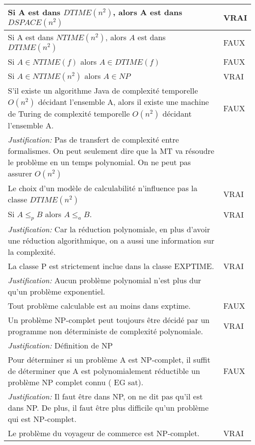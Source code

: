 \begin{longtable}{p{13cm}|l}
    Si A est dans $DTIME(n^{2})$, alors A est dans $DSPACE(n^{2})$ & VRAI\\
    \hline
    Si A est dans $NTIME(n^{2})$, alors $A$ est dans $DTIME(n^{2})$& FAUX \\
    \hline
    Si $A \in NTIME(f)$ alors $A\in DTIME(f)$ & FAUX \\
    \hline
    Si $A \in NTIME(n^{2})$ alors $A \in NP$ & VRAI \\
    \hline
    S'il existe un algorithme Java de complexité temporelle $O(n^{2})$ décidant l'ensemble A, alors il existe une machine de Turing de complexité temporelle $O(n^{2})$ décidant l'ensemble A.& FAUX \\
    \textit{Justification:} Pas de transfert de complexité entre formalismes. On peut seulement dire que la MT va résoudre le problème en un temps polynomial. On ne peut pas assurer $O(n^{2})$ & \\
    \hline
    Le choix d'un modèle de calculabilité n'influence pas la classe $DTIME(n^{2})$ & VRAI \\
    \hline
    Si $A \leq_{p} B$ alors $A \leq_{a} B$. & VRAI \\
    \textit{Justification:} Car la réduction polynomiale, en plus d’avoir une réduction algorithmique, on a aussi une information sur la complexité. & \\
    \hline
    La classe P est strictement inclue dans la classe EXPTIME. & VRAI \\
    \textit{Justification:} Aucun problème polynomial n’est plus dur qu’un problème exponentiel. & \\
    \hline
    Tout problème calculable est au moins dans exptime. & FAUX \\
    \hline
    Un problème NP-complet peut toujours être décidé par un programme non déterministe de complexité polynomiale. & VRAI \\
    \textit{Justification:} Définition de NP & \\
    \hline
    Pour déterminer si un problème A est NP-complet, il suffit de déterminer que A est polynomialement réductible un problème NP complet connu ( EG sat).& FAUX \\
    \textit{Justification:} Il faut être dans NP, on ne dit pas qu’il est dans NP. De plus, il faut être plus difficile qu’un problème qui est NP-complet. & \\
    \hline
    Le problème du voyageur de commerce est NP-complet. & VRAI \\
    \hline

\end{longtable}